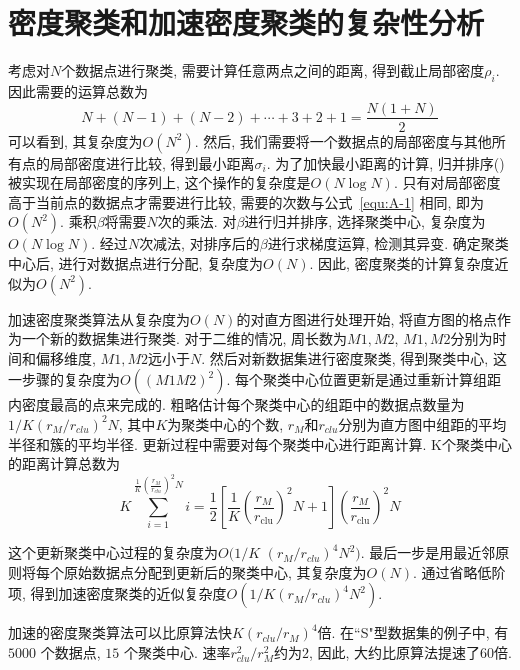 \section{密度聚类和加速密度聚类的复杂性分析\label{Appendix:A}}
考虑对$N$个数据点进行聚类, 需要计算任意两点之间的距离, 得到截止局部密度$\rho_i$. 因此需要的运算总数为
\begin{equation}
    N+(N-1)+(N-2)+\cdots+3+2+1=\frac{N(1+N)}{2}
    \label{equ:A-1}
\end{equation}
可以看到, 其复杂度为$O(N^2)$. 然后, 我们需要将一个数据点的局部密度与其他所有点的局部密度进行比较, 得到最小距离$\sigma_i$. 为了加快最小距离的计算, 归并排序(\cite{Satish2010})被实现在局部密度的序列上, 这个操作的复杂度是$O(N\log N)$. 只有对局部密度高于当前点的数据点才需要进行比较, 需要的次数与公式~\ref{equ:A-1} 相同, 即为$O(N^2)$. 乘积$\beta$将需要$N$次的乘法. 对$\beta$进行归并排序, 选择聚类中心, 复杂度为$O(N\log N)$. 经过$N$次减法, 对排序后的$\beta$进行求梯度运算, 检测其异变. 确定聚类中心后, 进行对数据点进行分配, 复杂度为$O(N)$. 因此, 密度聚类的计算复杂度近似为$O(N^2)$. 

加速密度聚类算法从复杂度为$O(N)$的对直方图进行处理开始, 将直方图的格点作为一个新的数据集进行聚类. 对于二维的情况, 周长数为$M1,M2$, $M1,M2$分别为时间和偏移维度, $M1, M2$远小于$N$. 然后对新数据集进行密度聚类, 得到聚类中心, 这一步骤的复杂度为$O((M1M2)^2)$. 每个聚类中心位置更新是通过重新计算组距内密度最高的点来完成的. 粗略估计每个聚类中心的组距中的数据点数量为$1/K(r_M/r_{clu})^2N$, 其中$K$为聚类中心的个数, $r_M$和$r_{clu}$分别为直方图中组距的平均半径和簇的平均半径. 更新过程中需要对每个聚类中心进行距离计算. K个聚类中心的距离计算总数为
\begin{equation}
    K \sum_{i=1}^{\frac{1}{K}(\frac{r_M}{r_{clu}})^2N} i=\frac{1}{2}\left[\frac{1}{K}\left(\frac{r_{M}}{r_{\mathrm{clu}}}\right)^{2} N+1\right]\left(\frac{r_{M}}{r_{\mathrm{clu}}}\right)^{2} N
\end{equation}

这个更新聚类中心过程的复杂度为$O(1/K$ $(r_M/r_{clu})^4N^2)$. 最后一步是用最近邻原则将每个原始数据点分配到更新后的聚类中心, 其复杂度为$O(N)$. 通过省略低阶项, 得到加速密度聚类的近似复杂度$O(1/K(r_M/r_{clu})^4N^2)$. 

加速的密度聚类算法可以比原算法快$K(r_{clu}/r_M)^4$倍. 在``S"型数据集的例子中, 有 $5000$ 个数据点, $15$ 个聚类中心. 速率$r_{clu}^2/r_M^2$约为$2$, 因此, 大约比原算法提速了$60$倍. 
